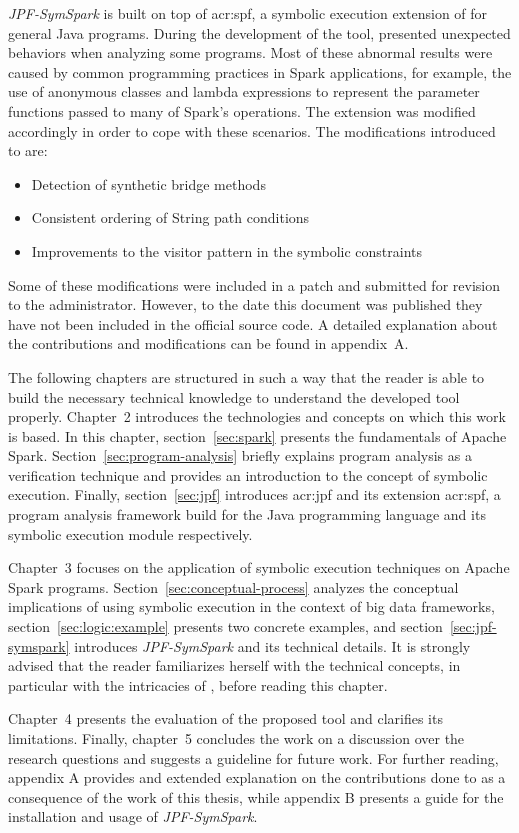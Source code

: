 \textit{JPF-SymSpark} is built on top of \acrfull{acr:spf}, a symbolic execution extension of \jpf{} for general Java programs. During the development of the tool, \spf{} presented unexpected behaviors when analyzing some programs. Most of these abnormal results were caused by common programming practices in Spark applications, for example, the use of anonymous classes and lambda expressions to represent the parameter functions passed to many of Spark's operations. The \spf{} extension was modified accordingly in order to cope with these scenarios. The modifications introduced to \spf{} are:

\begin{itemize}
	\item Detection of synthetic bridge methods
	\item Consistent ordering of String path conditions
	\item Improvements to the visitor pattern in the symbolic constraints
\end{itemize}

Some of these modifications were included in a patch and submitted for revision to the \spf{} administrator. However, to the date this document was published they have not been included in the official source code. A detailed explanation about the contributions and modifications can be found in appendix~A.


The following chapters are structured in such a way that the reader is able to build the necessary technical knowledge to understand the developed tool properly. Chapter~2 introduces the technologies and concepts on which this work is based. In this chapter, section~\ref{sec:spark} presents the fundamentals of Apache Spark. Section~\ref{sec:program-analysis} briefly explains program analysis as a verification technique and provides an introduction to the concept of symbolic execution. Finally, section~\ref{sec:jpf} introduces \acrlong{acr:jpf} and its extension \acrlong{acr:spf}, a program analysis framework build for the Java programming language and its symbolic execution module respectively.

Chapter~3 focuses on the application of symbolic execution techniques on Apache Spark programs. Section~\ref{sec:conceptual-process} analyzes the conceptual implications of using symbolic execution in the context of big data frameworks, section~\ref{sec:logic:example} presents two concrete examples, and section~\ref{sec:jpf-symspark} introduces \textit{JPF-SymSpark} and its technical details. It is strongly advised that the reader familiarizes herself with the technical concepts, in particular with the intricacies of \jpf{}, before reading this chapter.

Chapter~4 presents the evaluation of the proposed tool and clarifies its limitations. Finally, chapter~5 concludes the work on a discussion over the research questions and suggests a guideline for future work. For further reading, appendix A provides and extended explanation on the contributions done to \spf{} as a consequence of the work of this thesis, while appendix B presents a guide for the installation and usage of \textit{JPF-SymSpark}.

 
